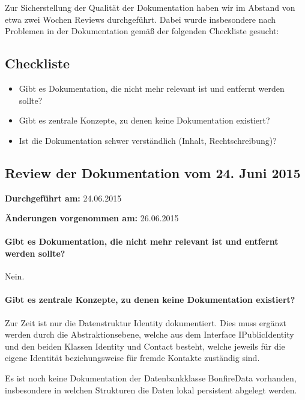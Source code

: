 

Zur Sicherstellung der Qualität der Dokumentation haben wir im Abstand von etwa zwei Wochen Reviews durchgeführt. Dabei wurde insbesondere nach Problemen in der Dokumentation gemäß der folgenden Checkliste gesucht:

\subsection{Checkliste}

\begin{itemize}
\item Gibt es Dokumentation, die nicht mehr relevant ist und entfernt werden sollte?
\item Gibt es zentrale Konzepte, zu denen keine Dokumentation existiert?
\item Ist die Dokumentation schwer verständlich (Inhalt, Rechtschreibung)?
\end{itemize}




\subsection{Review der Dokumentation vom 24. Juni 2015}

\textbf{Durchgeführt am:} 24.06.2015

\textbf{Änderungen vorgenommen am:} 26.06.2015

\paragraph{Gibt es Dokumentation, die nicht mehr relevant ist und entfernt werden sollte?}
Nein.

\paragraph{Gibt es zentrale Konzepte, zu denen keine Dokumentation existiert?}
Zur Zeit ist nur die Datenstruktur Identity dokumentiert. Dies muss ergänzt werden durch die Abstraktionsebene, welche aus dem Interface IPublicIdentity und den beiden Klassen Identity und Contact besteht, welche jeweils für die eigene Identität beziehungsweise für fremde Kontakte zuständig sind.

Es ist noch keine Dokumentation der Datenbankklasse BonfireData vorhanden, insbesondere in welchen Strukturen die Daten lokal persistent abgelegt werden.

